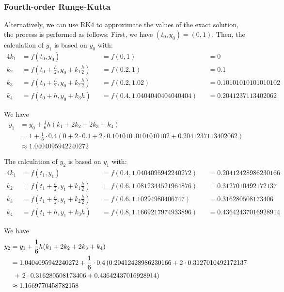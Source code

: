 \documentclass[a4paper]{article}
\numberwithin{equation}{section}
\begin{document}
\subsubsection{Fourth-order Runge-Kutta}
Alternatively, we can use RK4 to approximate the values of the exact solution, the process is performed as follows:
First, we have \((t_0, y_0) = (0, 1)\). Then, the calculation of \(y_1\) is based on \(y_0\) with:
\begin{alignat*}{4}
  k_1 & = f(t_0, y_0)                                            &  & = f(0, 1)                    &  & = 0                   \\
  k_2 & = f \left(t_0 + \frac{h}{2}, y_0 + k_1\frac{h}{2}\right) &  & = f(0.2, 1)                  &  & = 0.1                 \\
  k_3 & = f \left(t_0 + \frac{h}{2}, y_0 + k_2\frac{h}{2}\right) &  & = f(0.2, 1.02)               &  & = 0.10101010101010102 \\
  k_4 & = f(t_0 + h, y_0 + k_3h)                                 &  & = f(0.4, 1.0404040404040404) &  & = 0.2041237113402062
\end{alignat*}

We have
\begin{align*}
  y_1 & = y_0 + \frac{1}{6}h(k_1 + 2k_2 + 2k_3 + k_4)                                                              \\
      & = 1 + \frac{1}{6} \cdot 0.4\left(0 + 2 \cdot 0.1 + 2 \cdot 0.10101010101010102 + 0.2041237113402062\right) \\
      & \approx 1.0404095942240272
\end{align*}

The calculation of \(y_2\) is based on \(y_1\) with:
\begin{alignat*}{4}
  k_1 & = f(t_1, y_1)                                            &  & = f(0.4, 1.0404095942240272) &  & = 0.20412428986230166 \\
  k_2 & = f \left(t_1 + \frac{h}{2}, y_1 + k_1\frac{h}{2}\right) &  & = f(0.6, 1.0812344521964876) &  & = 0.3127010492172137  \\
  k_3 & = f \left(t_1 + \frac{h}{2}, y_1 + k_2\frac{h}{2}\right) &  & = f(0.6, 1.10294980406747)   &  & = 0.316280508173406   \\
  k_4 & = f(t_1 + h, y_1 + k_3h)                                 &  & = f(0.8, 1.1669217974933896) &  & = 0.43642437016928914
\end{alignat*}

We have
\begin{align*}
  y_2 & = y_1 + \frac{1}{6}h(k_1 + 2k_2 + 2k_3 + k_4)                                                             \\
      & = 1.0404095942240272 + \frac{1}{6} \cdot 0.4\left(0.20412428986230166 + 2 \cdot 0.3127010492172137\right. \\
      & \ \left.+\ 2 \cdot 0.316280508173406 + 0.43642437016928914\vphantom{1}\right)                             \\
      & \approx 1.1669770458782158
\end{align*}
\end{document}

